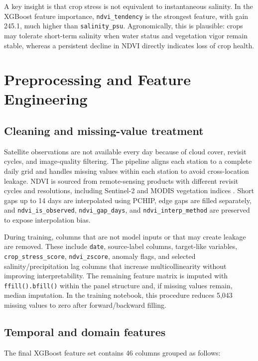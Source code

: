 \documentclass[a4paper, 11pt]{article}
\begin{document}
A key insight is that crop stress is not equivalent to instantaneous salinity. In the XGBoost feature importance, \texttt{ndvi\_tendency} is the strongest feature, with gain 245.1, much higher than \texttt{salinity\_psu}. Agronomically, this is plausible: crops may tolerate short-term salinity when water status and vegetation vigor remain stable, whereas a persistent decline in NDVI directly indicates loss of crop health.

\section{Preprocessing and Feature Engineering}

\subsection{Cleaning and missing-value treatment}

Satellite observations are not available every day because of cloud cover, revisit cycles, and image-quality filtering. The pipeline aligns each station to a complete daily grid and handles missing values within each station to avoid cross-location leakage. NDVI is sourced from remote-sensing products with different revisit cycles and resolutions, including Sentinel-2 and MODIS vegetation indices \cite{modisvi}. Short gaps up to 14 days are interpolated using PCHIP, edge gaps are filled separately, and \texttt{ndvi\_is\_observed}, \texttt{ndvi\_gap\_days}, and \texttt{ndvi\_interp\_method} are preserved to expose interpolation bias.

During training, columns that are not model inputs or that may create leakage are removed. These include \texttt{date}, source-label columns, target-like variables, \texttt{crop\_stress\_score}, \texttt{ndvi\_zscore}, anomaly flags, and selected salinity/precipitation lag columns that increase multicollinearity without improving interpretability. The remaining feature matrix is imputed with \texttt{ffill().bfill()} within the panel structure and, if missing values remain, median imputation. In the training notebook, this procedure reduces 5,043 missing values to zero after forward/backward filling.

\subsection{Temporal and domain features}

The final XGBoost feature set contains 46 columns grouped as follows:
\end{document}
